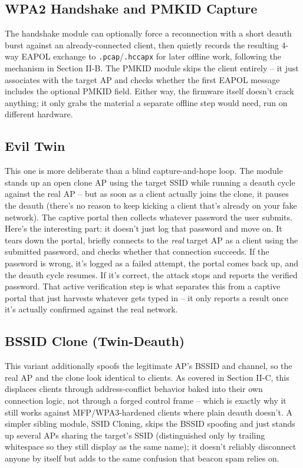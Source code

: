 \documentclass[conference]{IEEEtran}
\begin{document}
\subsection{WPA2 Handshake and PMKID Capture}
The handshake module can optionally force a reconnection with a short deauth burst against an already-connected client, then quietly records the resulting 4-way EAPOL exchange to \texttt{.pcap}/\texttt{.hccapx} for later offline work, following the mechanism in Section II-B. The PMKID module skips the client entirely -- it just associates with the target AP and checks whether the first EAPOL message includes the optional PMKID field. Either way, the firmware itself doesn't crack anything; it only grabs the material a separate offline step would need, run on different hardware.

\subsection{Evil Twin}
This one is more deliberate than a blind capture-and-hope loop. The module stands up an open clone AP using the target SSID while running a deauth cycle against the real AP -- but as soon as a client actually joins the clone, it pauses the deauth (there's no reason to keep kicking a client that's already on your fake network). The captive portal then collects whatever password the user submits. Here's the interesting part: it doesn't just log that password and move on. It tears down the portal, briefly connects to the \emph{real} target AP as a client using the submitted password, and checks whether that connection succeeds. If the password is wrong, it's logged as a failed attempt, the portal comes back up, and the deauth cycle resumes. If it's correct, the attack stops and reports the verified password. That active verification step is what separates this from a captive portal that just harvests whatever gets typed in -- it only reports a result once it's actually confirmed against the real network.

\subsection{BSSID Clone (Twin-Deauth)}
This variant additionally spoofs the legitimate AP's BSSID and channel, so the real AP and the clone look identical to clients. As covered in Section II-C, this displaces clients through address-conflict behavior baked into their own connection logic, not through a forged control frame -- which is exactly why it still works against MFP/WPA3-hardened clients where plain deauth doesn't. A simpler sibling module, SSID Cloning, skips the BSSID spoofing and just stands up several APs sharing the target's SSID (distinguished only by trailing whitespace so they still display as the same name); it doesn't reliably disconnect anyone by itself but adds to the same confusion that beacon spam relies on.
\end{document}
